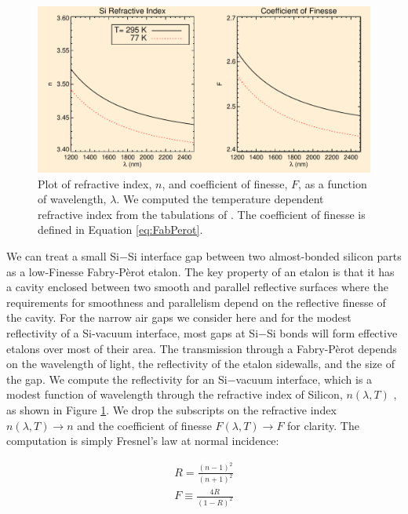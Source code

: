 \documentclass[osajnl,preprint,showpacs,superscriptaddress,12pt]{revtex4-1} %
\begin{document}
\begin{figure}[htbp]
\includegraphics[width=0.95\columnwidth]{figs/SiIndexAOmgsFinesseFig.pdf}
\caption{Plot of refractive index, $n$, and coefficient of finesse, $F$, as a function of wavelength, $\lambda$.\label{figSiIndexFinesse} We computed the temperature dependent refractive index from the tabulations of \cite{2006SPIE.6273E..77F}.  The coefficient of finesse is defined in Equation \ref{eq:FabPerot}.}
\end{figure}

We can treat a small Si$-$Si interface gap between two almost-bonded silicon parts as a low-Finesse Fabry-P\`{e}rot etalon\cite{2007fuph.book.....S}.  The key property of an etalon is that it has a cavity enclosed between two smooth and parallel reflective surfaces where the requirements for smoothness and parallelism depend on the reflective finesse of the cavity.  For the narrow air gaps we consider here and for the modest reflectivity of a Si-vacuum interface, most gaps at Si$-$Si bonds will form effective etalons over most of their area.  The transmission through a Fabry-P\`{e}rot depends on the wavelength of light, the reflectivity of the etalon sidewalls, and the size of the gap.  We compute the reflectivity for an Si$-$vacuum interface, which is a modest function of wavelength through the refractive index of Silicon, $n(\lambda, T)$ \cite{2006SPIE.6273E..77F}, as shown in Figure \ref{figSiIndexFinesse}.  We drop the subscripts on the refractive index $n(\lambda, T) \rightarrow n$ and the coefficient of finesse $F(\lambda, T) \rightarrow F$ for clarity.  The computation is simply Fresnel's law at normal incidence:

\begin{eqnarray}
R = \frac{(n-1)^2}{(n+1)^2} \label{Eq:FresnelR}\\
F \equiv \frac{4R}{(1-R)^2} \label{Eq:coeffF}
\end{eqnarray}
\end{document}
